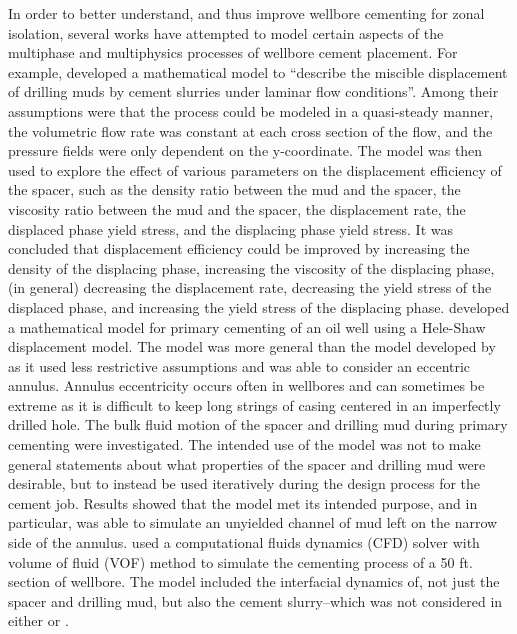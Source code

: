 \documentclass[pdftex,ms]{pittetd}
\begin{document}

In order to better understand, and thus improve wellbore cementing for zonal isolation, several works have attempted to model certain aspects of the multiphase and multiphysics processes of wellbore cement placement.
For example, \citet{Bei77} developed a mathematical model to ``describe the miscible displacement of drilling muds by cement slurries under laminar flow conditions''.
Among their assumptions were that the process could be modeled in a quasi-steady manner, the volumetric flow rate was constant at each cross section of the flow, and the pressure fields were only dependent on the y-coordinate.
The model was then used to explore the effect of various parameters on the displacement efficiency of the spacer, such as the density ratio between the mud and the spacer, the viscosity ratio between the mud and the spacer, the displacement rate, the displaced phase yield stress, and the displacing phase yield stress.
It was concluded that displacement efficiency could be improved by increasing the density of the displacing phase, increasing the viscosity of the displacing phase, (in general) decreasing the displacement rate, decreasing the yield stress of the displaced phase, and increasing the yield stress of the displacing phase.
\citet{Bit02} developed a mathematical model for primary cementing of an oil well using a Hele-Shaw displacement model.
The model was more general than the model developed by \citeauthor{Bei77} as it used less restrictive assumptions and was able to consider an eccentric annulus.
Annulus eccentricity occurs often in wellbores and can sometimes be extreme as it is difficult to keep long strings of casing centered in an imperfectly drilled hole.
The bulk fluid motion of the spacer and drilling mud during primary cementing were investigated.
The intended use of the model was not to make general statements about what properties of the spacer and drilling mud were desirable, but to instead be used iteratively during the design process for the cement job.
Results showed that the model met its intended purpose, and in particular, was able to simulate an unyielded channel of mud left on the narrow side of the annulus.
\citet{Zul12} used a computational fluids dynamics (CFD) solver with volume of fluid (VOF) method to simulate the cementing process of a 50 ft. section of wellbore.
The model included the interfacial dynamics of, not just the spacer and drilling mud, but also the cement slurry--which was not considered in either \citeauthor{Bei77} or \citeauthor{Bit02}.
\end{document}
